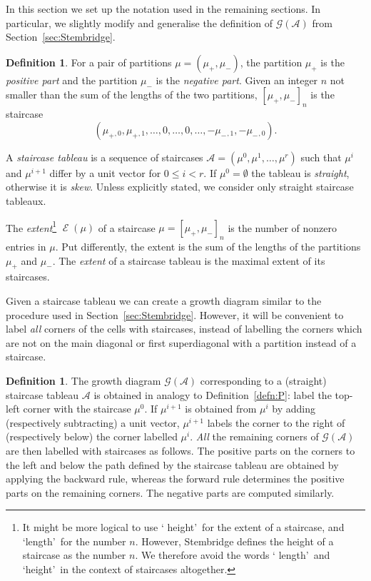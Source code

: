 \documentclass[10pt]{article}
\theoremstyle{definition}
\newtheorem{defi}[theorem]{Definition}
\newcommand{\Dfn}[1]{\emph{\color{blue}#1}}
\DeclareMathOperator{\extent}{\mathcal{E}} %
\newcommand{\wgt}{\mu}
\newcommand{\alt}{\mathcal{A}} %
\newcommand{\Grm}{\mathcal{G}} %
\newcommand{\pos}[1]{#1_+} %
\renewcommand{\neg}[1]{#1_-} %
\begin{document}
In this section we set up the notation used in the remaining
sections. In particular, we slightly modify and generalise the
definition of $\Grm(\alt)$ from Section~\ref{sec:Stembridge}.
\begin{defi}
 For a pair of partitions $\wgt=(\pos\wgt,\neg\wgt)$, the partition
 $\pos\wgt$ is the \Dfn{positive part} and the partition $\neg\wgt$
 is the \Dfn{negative part}. Given an integer $n$ not smaller than
 the sum of the lengths of the two partitions,
 $[\pos\wgt,\neg\wgt]_n$ is the staircase
 \[
 ({\pos\wgt}{}_{,0},\pos\wgt{}_{,1},\dots,0,\dots,0,
 \dots,-\neg\wgt{}_{,1},-\neg\wgt{}_{,0}).
 \]

 A \Dfn{staircase tableau} is a sequence of staircases
 $\alt=(\wgt^0,\wgt^1,\dots,\wgt^r)$ such that $\wgt^i$ and
 $\wgt^{i+1}$ differ by a unit vector for $0\leq i<r$. If
 $\wgt^0=\emptyset$ the tableau is \Dfn{straight}, otherwise it is
 \Dfn{skew}. Unless explicitly stated, we consider only straight
 staircase tableaux.

 The \Dfn{extent}\footnote{It might be more logical to use \lq
 height\rq\ for the extent of a staircase, and \lq length\rq\ for
 the number $n$. However, Stembridge defines the height of a
 staircase as the number $n$. We therefore avoid the words \lq
 length\rq\ and \lq height\rq\ in the context of staircases
 altogether.} $\extent(\wgt)$ of a staircase
 $\wgt=[\pos\wgt,\neg\wgt]_n$ is the number of nonzero entries in
 $\wgt$. Put differently, the extent is the sum of the lengths of
 the partitions $\pos\wgt$ and $\neg\wgt$. The \Dfn{extent} of a
 staircase tableau is the maximal extent of its staircases.
\end{defi}

Given a staircase tableau we can create a growth diagram similar to
the procedure used in Section~\ref{sec:Stembridge}. However, it will
be convenient to label \emph{all} corners of the cells with
staircases, instead of labelling the corners which are not on the
main diagonal or first superdiagonal with a partition instead of a
staircase.
\begin{defi}
 The growth diagram \Dfn{$\Grm(\alt)$} corresponding to a (straight)
 staircase tableau $\alt$ is obtained in analogy to
 Definition~\ref{defn:P}: label the top-left corner with the
 staircase $\wgt^0$. If $\wgt^{i+1}$ is obtained from $\wgt^i$ by
 adding (respectively subtracting) a unit vector, $\wgt^{i+1}$
 labels the corner to the right of (respectively below) the corner
 labelled $\wgt^i$. \emph{All} the remaining corners of $\Grm(\alt)$
 are then labelled with staircases as follows. The positive parts
 on the corners to the left and below the path defined by the
 staircase tableau are obtained by applying the backward rule,
 whereas the forward rule determines the positive parts on the
 remaining corners. The negative parts are computed similarly.
\end{defi}
 
\end{document}
